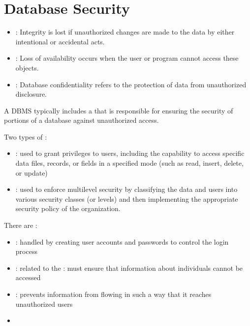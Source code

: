 \chapter{Database Security}

    \par {}
      \begin{itemize}
        \item {}: Integrity is lost if unauthorized changes are made to the data by
        either intentional or accidental acts.
        \item {}: Loss of availability occurs when the user or program cannot access these objects.
        \item {}: Database confidentiality refers to the protection of data from unauthorized disclosure.
      \end{itemize}
    \par A DBMS typically includes a  that is responsible for ensuring the security of portions of a database
    against unauthorized access.
    \par Two types of :
    \begin{itemize}
      \item {}: used to grant privileges to users, including the capability to access specific data files, records, or fields in a specified mode (such as read, insert, delete, or update)
      \item {}: used to enforce multilevel
      security by classifying the data and users into various security classes (or levels) and then implementing the appropriate security policy of the organization.
    \end{itemize}
  
    \par There are :
    \begin{itemize}
      \item {}: handled by creating user accounts and passwords to control the login process
      \item {}: related to the : must ensure that information about individuals cannot be accessed
      \item {}: prevents information from flowing in such a way that it reaches unauthorized users
      \item {}
    \end{itemize}

